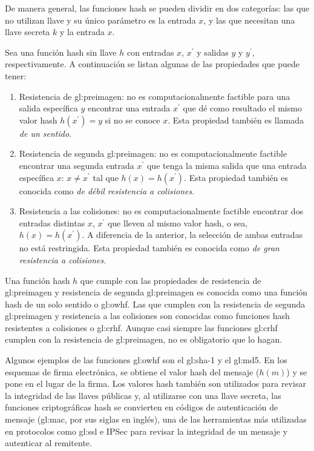 De manera general, las funciones hash se pueden dividir en dos
categorías: las que no utilizan llave y su único parámetro es la entrada
$x$, y las que necesitan una llave secreta $k$ y la entrada $x$.

Sea una función hash sin llave $h$ con entradas $x$, $x^\prime$ y
salidas $y$ y $y^\prime$, respectivamente. A continuación se listan
algunas de las propiedades que puede tener:

\begin{enumerate}
  \item Resistencia de \gls{gl:preimagen}: no es computacionalmente factible
    para una salida específica $y$ encontrar una entrada $x^\prime$ que
    dé como resultado el mismo valor hash $h(x^\prime) = y$ si no se
    conoce $x$. Esta propiedad también es llamada
    \textit{de un sentido}.
  \item Resistencia de segunda \gls{gl:preimagen}: no es computacionalmente
    factible encontrar una segunda entrada $x^\prime$  que tenga la
    misma salida que una entrada específica $x$: $x \neq x^\prime$
    tal que $h(x) = h(x^\prime)$. Esta propiedad también es conocida
    como \textit{de débil resistencia a colisiones}.
  \item Resistencia a las colisiones: no es computacionalmente factible
    encontrar dos entradas distintas $x$, $x^\prime$ que lleven al
    mismo valor hash, o sea, $h(x) = h(x^\prime)$. A diferencia de la
    anterior, la selección de ambas entradas no está restringida. Esta
    propiedad también es conocida como
    \textit{de gran resistencia a colisiones}.
\end{enumerate}

Una función hash $h$ que cumple con las propiedades de resistencia de
\gls{gl:preimagen} y resistencia de segunda \gls{gl:preimagen} es conocida como
una función hash de un solo sentido o \gls{gl:owhf}.
Las que cumplen con la resistencia de segunda \gls{gl:preimagen} y
resistencia a las colisiones son conocidas como funciones hash
resistentes a colisiones o \gls{gl:crhf}. Aunque casi siempre las
funciones \gls{gl:crhf} cumplen con la resistencia de \gls{gl:preimagen},
no es obligatorio que lo hagan.

Algunos ejemplos de las funciones \gls{gl:owhf} son el \gls{gl:sha}-1
y el \gls{gl:md5}. En los esquemas de firma electrónica, se obtiene el
valor hash del mensaje ($h(m)$) y se pone en el lugar de la firma. Los valores
hash también son utilizados para revisar la integridad de las llaves
públicas y, al utilizarse con una llave secreta, las funciones
criptográficas hash se convierten en códigos de autenticación de mensaje
(\gls{gl:mac}, por sus siglas en inglés), una de las herramientas más
utilizadas en protocolos como \gls{gl:ssl} e IPSec para revisar la
integridad de un mensaje y autenticar al remitente.

